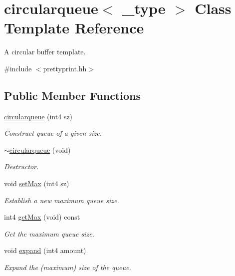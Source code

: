 \hypertarget{classcircularqueue}{}\section{circularqueue$<$ \+\_\+type $>$ Class Template Reference}
\label{classcircularqueue}


A circular buffer template.  




{\ttfamily \#include $<$prettyprint.\+hh$>$}

\subsection*{Public Member Functions}
\begin{DoxyCompactItemize}
\item 
\mbox{\hyperlink{classcircularqueue_a42319b17b68d214cbf35f4d92d6bb32e}{circularqueue}} (int4 sz)
\begin{DoxyCompactList}\small\item\em Construct queue of a given size. \end{DoxyCompactList}\item 
\mbox{\hyperlink{classcircularqueue_aaeebb1a2be28d813c1c8794ae4500dde}{$\sim$circularqueue}} (void)
\begin{DoxyCompactList}\small\item\em Destructor. \end{DoxyCompactList}\item 
void \mbox{\hyperlink{classcircularqueue_ae6a9f2564ea93c5beec9212764bf25de}{set\+Max}} (int4 sz)
\begin{DoxyCompactList}\small\item\em Establish a new maximum queue size. \end{DoxyCompactList}\item 
int4 \mbox{\hyperlink{classcircularqueue_a61a4ec11faa1e93786f6a8ddf0fa147a}{get\+Max}} (void) const
\begin{DoxyCompactList}\small\item\em Get the maximum queue size. \end{DoxyCompactList}\item 
void \mbox{\hyperlink{classcircularqueue_aef399e8b70e1ba008d6f515d9f45b59f}{expand}} (int4 amount)
\begin{DoxyCompactList}\small\item\em Expand the (maximum) size of the queue. \end{DoxyCompactList}\item 

\end{DoxyCompactItemize}
